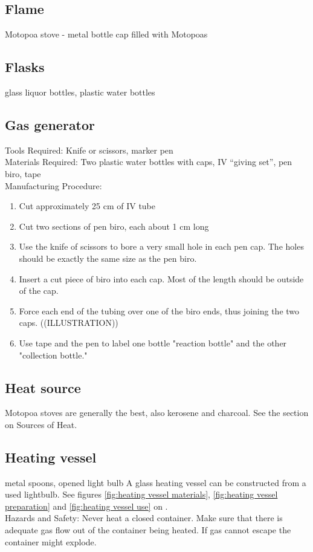 \subsection*{Flame}
Motopoa stove - metal bottle cap filled with Motopoas

\subsection*{Flasks}
glass liquor bottles, plastic water bottles

\subsection*{Gas generator}
Tools Required: Knife or scissors, marker pen\\
Materials Required: Two plastic water bottles with caps, IV ``giving set'', pen biro, tape\\
Manufacturing Procedure:
\begin{enumerate}
\item{Cut approximately 25 cm of IV tube}
\item{Cut two sections of pen biro, each about 1 cm long}
\item{Use the knife of scissors to bore a very small hole in each pen cap. The holes should be exactly the same size as the pen biro.}
\item{Insert a cut piece of biro into each cap. Most of the length should be outside of the cap.}
\item{Force each end of the tubing over one of the biro ends, thus joining the two caps. ((ILLUSTRATION))}
\item{Use tape and the pen to label one bottle "reaction bottle" and the other "collection bottle."}
\end{enumerate}

\subsection*{Heat source}
Motopoa stoves are generally the best, also kerosene and charcoal. See the section on Sources of Heat.

\subsection*{Heating vessel}
metal spoons, opened light bulb
A glass heating vessel can be constructed from a used lightbulb. See figures \ref{fig:heating vessel materials}, \ref{fig:heating vessel preparation} and \ref{fig:heating vessel use} on \pageref{fig:heating vessel use}.\\
Hazards and Safety: Never heat a closed container. Make sure that there is adequate gas flow out of the container being heated. If gas cannot escape the container might explode.

